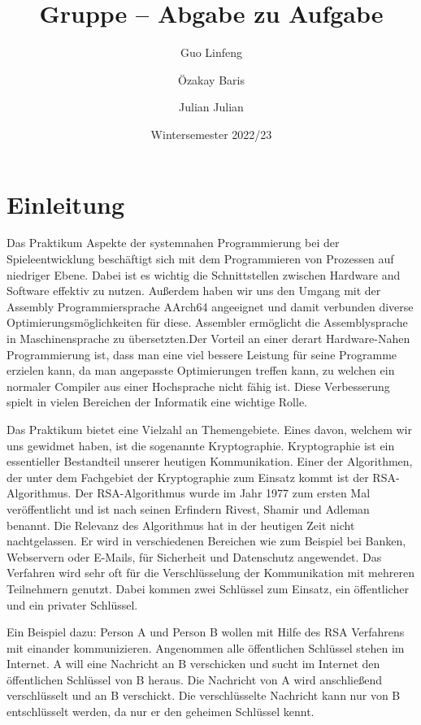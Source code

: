 \documentclass[course=asp]{aspdoc}
\author{Guo Linfeng \and Özakay Baris \and Julian Julian}
\date{Wintersemester 2022/23} %
\title{Gruppe \theGroup{} -- Abgabe zu Aufgabe \theNumber}
\begin{document}
\maketitle

\section{Einleitung}
Das Praktikum Aspekte der systemnahen Programmierung bei der Spieleentwicklung beschäftigt sich mit dem Programmieren von Prozessen auf niedriger Ebene. Dabei ist es wichtig die Schnittstellen zwischen Hardware and Software effektiv zu nutzen. Außerdem haben wir uns den Umgang mit der Assembly Programmiersprache AArch64 angeeignet und damit verbunden diverse Optimierungsmöglichkeiten für diese. Assembler ermöglicht die Assemblysprache in Maschinensprache zu übersetzten.Der Vorteil an einer derart Hardware-Nahen Programmierung ist, dass man eine viel bessere Leistung für seine Programme erzielen kann, da man angepasste Optimierungen treffen kann, zu welchen ein normaler Compiler aus einer Hochsprache nicht fähig ist. Diese Verbesserung spielt in vielen Bereichen der Informatik eine wichtige Rolle.

Das Praktikum bietet eine Vielzahl an Themengebiete. Eines davon, welchem wir uns gewidmet haben, ist die sogenannte Kryptographie. Kryptographie ist ein essentieller Bestandteil unserer heutigen Kommunikation. Einer der Algorithmen, der unter dem Fachgebiet der Kryptographie zum Einsatz kommt ist der RSA-Algorithmus. Der RSA-Algorithmus wurde im Jahr 1977 zum ersten Mal veröffentlicht und ist nach seinen Erfindern Rivest, Shamir und Adleman benannt. Die Relevanz des Algorithmus hat in der heutigen Zeit nicht nachtgelassen. Er wird in verschiedenen Bereichen wie zum Beispiel bei Banken, Webservern oder E-Mails, für Sicherheit und Datenschutz angewendet. Das Verfahren wird sehr oft für die Verschlüsselung der Kommunikation mit mehreren Teilnehmern genutzt. Dabei kommen zwei Schlüssel zum Einsatz, ein öffentlicher und ein privater Schlüssel. 

Ein Beispiel dazu: Person A und Person B wollen mit Hilfe des RSA Verfahrens mit einander kommunizieren. Angenommen alle öffentlichen Schlüssel stehen im Internet. A will eine Nachricht an B verschicken und sucht im Internet den öffentlichen Schlüssel von B heraus. Die Nachricht von A wird anschließend verschlüsselt und an B verschickt. Die verschlüsselte Nachricht kann nur von B entschlüsselt werden, da nur er den geheimen Schlüssel kennt. 
 
\end{document}
